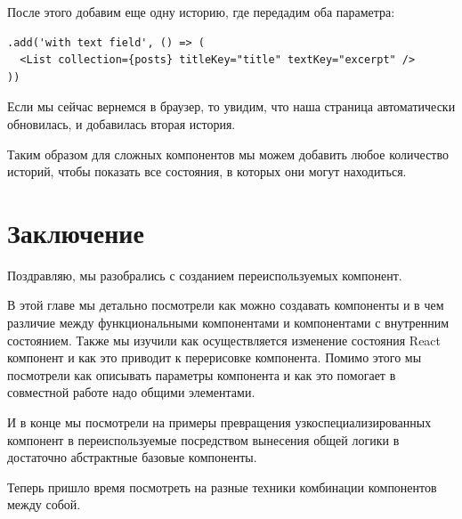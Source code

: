 После этого добавим еще одну историю, где передадим оба параметра:

\begin{lstlisting}
.add('with text field', () => (
  <List collection={posts} titleKey="title" textKey="excerpt" />
))
\end{lstlisting}

Если мы сейчас вернемся в браузер, то увидим, что наша страница автоматически обновилась, и добавилась вторая история.

Таким образом для сложных компонентов мы можем добавить любое количество историй, чтобы показать все состояния, в которых они могут находиться.

\section{Заключение}

Поздравляю, мы разобрались с созданием переиспользуемых компонент.

В этой главе мы детально посмотрели как можно создавать компоненты и в чем различие между функциональными компонентами и компонентами с внутренним состоянием. Также мы изучили как осуществляется изменение состояния React компонент и как это приводит к перерисовке компонента. Помимо этого мы посмотрели как описывать параметры компонента и как это помогает в совместной работе надо общими элементами.

И в конце мы посмотрели на примеры превращения узкоспециализированных компонент в переиспользуемые посредством вынесения общей логики в достаточно абстрактные базовые компоненты.

Теперь пришло время посмотреть на разные техники комбинации компонентов между собой.



